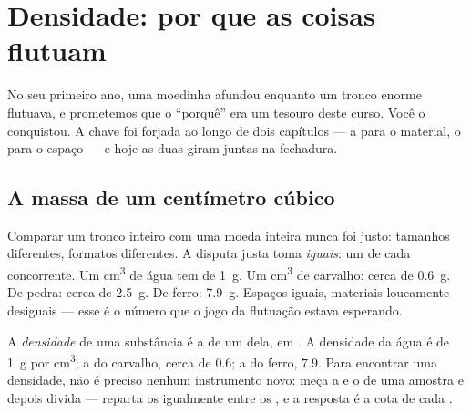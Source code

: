 \chapter{Densidade: por que as coisas flutuam}\label{ch:g6:density-floating}

No seu primeiro ano, uma moedinha afundou enquanto um tronco enorme
flutuava, e prometemos que o ``porquê'' era um tesouro deste curso.
Você o conquistou. A chave foi forjada ao longo de dois capítulos ---
a  para o material, o  para o espaço --- e hoje as duas
giram juntas na fechadura.

\section{A massa de um centímetro cúbico}

\begin{example}\label{ex:g6:density-floating:fair}
Comparar um tronco inteiro com uma moeda inteira nunca foi justo:
tamanhos diferentes, formatos diferentes. A disputa justa toma
\emph{ iguais}: um  de cada concorrente. Um
\unit{cm^3} de água tem  de \qty{1}{g}. Um \unit{cm^3} de
carvalho: cerca de \qty{0.6}{g}. De pedra: cerca de \qty{2.5}{g}. De
ferro: \qty{7.9}{g}. Espaços iguais, materiais loucamente desiguais
--- esse é o número que o jogo da flutuação estava esperando.
\end{example}

\begin{definition}[Densidade]\label{def:g6:density-floating:density}
A \emph{densidade} de uma substância é a  de um
 dela, em . A densidade da água é de
\qty{1}{g} por \unit{cm^3}; a do carvalho, cerca de $0.6$; a do
ferro, $7.9$. Para encontrar uma densidade, não é preciso nenhum
instrumento novo: meça a  e o  de uma amostra e depois
divida --- reparta os  igualmente entre os ,
e a resposta é a cota de cada .
\end{definition}

